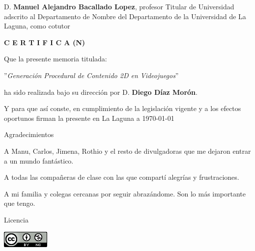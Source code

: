 \documentclass[spanish,a4paper,12pt,oneside]{extreport}
\begin{document}
\bigskip
D. {\bf Manuel Alejandro Bacallado Lopez}, profesor Titular de Universidad adscrito al Departamento de Nombre del Departamento de la Universidad de La Laguna, como cotutor\pagestyle{empty}

\bigskip
\bigskip
{\bf C E R T I F I C A (N)}

\bigskip
\bigskip
Que la presente memoria titulada:

\bigskip
''{\it Generación Procedural de Contenido 2D en Videojuegos}''

\bigskip
\bigskip
\bigskip

\noindent ha sido realizada bajo su dirección por D. {\bf Diego Díaz Morón}.

\bigskip
\bigskip

Y para que así conste, en cumplimiento de la legislación vigente y a los efectos
oportunos firman la presente en La Laguna a \today

\newpage
\thispagestyle{empty}

{ \flushright

\begin{LARGE}
Agradecimientos
\end{LARGE}

\hspace{3mm}

\begin{large}
A Manu, Carlos, Jimena, Rothio y el resto de divulgadoras que me dejaron entrar a un mundo fantástico.

A todas las compañeras de clase con las que compartí alegrías y frustraciones.

A mi familia y colegas cercanas por seguir abrazándome. Son lo más importante que tengo.
\end{large}

}

\newpage
\thispagestyle{empty}

\bigskip
\begin{LARGE}
Licencia
\end{LARGE}

\bigskip
\begin{center}
\includegraphics[scale=1.8]{images/by-nc_88x31}\\[5mm]
\end{center}
\end{document}
